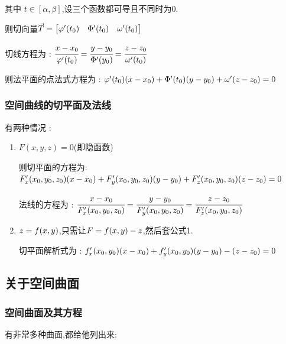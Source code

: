 {{{      其中 $t \in [\alpha,\beta]$,设三个函数都可导且不同时为0.

      则切向量$\vec{T} = \begin{bmatrix}
          \varphi^\prime(t_0) & \Phi^\prime(t_0) & \omega^\prime(t_0)
        \end{bmatrix}$

      切线方程为 : $\cfrac{x - x_0}{\varphi^\prime(t_0)} = \cfrac{y - y_0}{\Phi^\prime(y_0)} = \cfrac{z - z_0}{\omega^\prime(t_0)}$

      则法平面的点法式方程为 : $\varphi^\prime(t_0)(x - x_0) + \Phi^\prime(t_0)(y - y_0) + \omega^\prime(z - z_0) = 0$
    }%

    \subsubsection{空间曲线的切平面及法线}{
      有两种情况 :

      \begin{enumerate}
        \item {
              $F(x,y,z) = 0$(即隐函数)

              则切平面的方程为:$F^\prime_x(x_0,y_0,z_0)(x - x_0) + F^\prime_y(x_0,y_0,z_0)(y - y_0) + F^\prime_z(x_0,y_0,z_0)(z - z_0) = 0$

              法线的方程为 : $\cfrac{x - x_0}{F^\prime_x(x_0,y_0,z_0)} = \cfrac{y - y_0}{F^\prime_y(x_0,y_0,z_0)} = \cfrac{z - z_0}{F^\prime_z(x_0,y_0,z_0)}$
              }
        \item {
              $z = f(x,y)$,只需让$F = f(x,y) - z$,然后套公式1.

              切平面解析式为 : $f^\prime_x(x_0,y_0)(x - x_0) + f^\prime_y(x_0,y_0)(y - y_0) - (z - z_0) = 0$
              }
      \end{enumerate}
    }%

  }%

  \subsection{关于空间曲面}{

    \subsubsection{空间曲面及其方程}{
      有非常多种曲面,都给他列出来:

}}}
